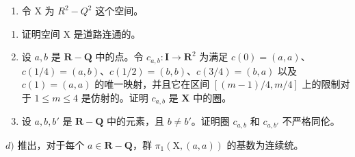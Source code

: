 \begin{enumerate}
\def\labelenumi{\arabic{enumi})}
\setcounter{enumi}{5}
\tightlist
\item
令 X 为 \(R^{2}-Q^{2}\) 这个空间。
\end{enumerate}

\begin{enumerate}
\def\labelenumi{\alph{enumi})}
\item
证明空间 X 是道路连通的。
\item
设 \(a, b\) 是 \(\mathbf{R} - \mathbf{Q}\) 中的点。令 \(c_{a,b}: \mathbf{I} \to \mathbf{R}^2\) 为满足 \(c(0) = (a, a)\)、\(c(1/4) = (a, b)\)、\(c(1/2) = (b, b)\)、\(c(3/4) = (b, a)\) 以及 \(c(1) = (a, a)\) 的唯一映射，并且它在区间 \([(m-1)/4, m/4]\) 上的限制对于 \(1 \leqslant m \leqslant 4\) 是仿射的。证明 \(c_{a,b}\) 是 \(\mathbf{X}\) 中的圈。
\item
设 \(a, b, b'\) 是 \(\mathbf{R} - \mathbf{Q}\) 中的元素，且 \(b \neq b'\)。证明圈 \(c_{a,b}\) 和 \(c_{a,b'}\) 不严格同伦。
\end{enumerate}

\(d)\) 推出，对于每个 \(a \in \mathbf{R} - \mathbf{Q}\)，群 \(\pi_1(\mathrm{X}, (a, a))\) 的基数为连续统。
\relax{}
